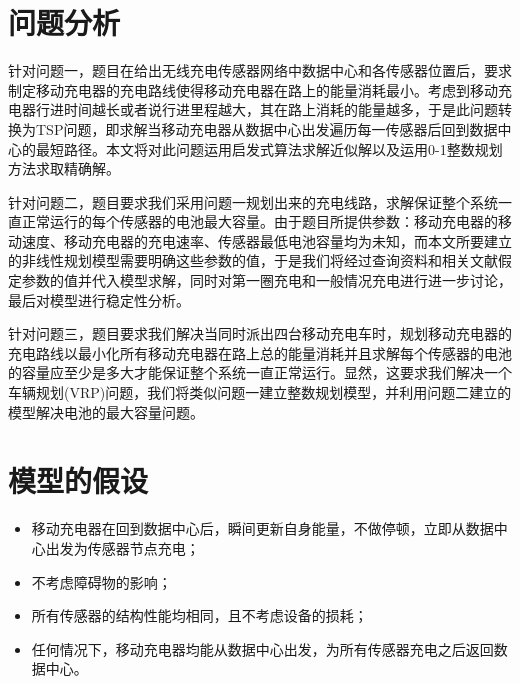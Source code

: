 \documentclass[withoutpreface,bwprint]{cumcmthesis} %
\begin{document}
\section{问题分析}
针对问题一，题目在给出无线充电传感器网络中数据中心和各传感器位置后，要求制定移动充电器的充电路线使得移动充电器在路上的能量消耗最小。考虑到移动充电器行进时间越长或者说行进里程越大，其在路上消耗的能量越多，于是此问题转换为TSP问题，即求解当移动充电器从数据中心出发遍历每一传感器后回到数据中心的最短路径。本文将对此问题运用启发式算法求解近似解以及运用0-1整数规划方法求取精确解。\par
针对问题二，题目要求我们采用问题一规划出来的充电线路，求解保证整个系统一直正常运行的每个传感器的电池最大容量。由于题目所提供参数：移动充电器的移动速度、移动充电器的充电速率、传感器最低电池容量均为未知，而本文所要建立的非线性规划模型需要明确这些参数的值，于是我们将经过查询资料和相关文献假定参数的值并代入模型求解，同时对第一圈充电和一般情况充电进行进一步讨论，最后对模型进行稳定性分析。\par
针对问题三，题目要求我们解决当同时派出四台移动充电车时，规划移动充电器的充电路线以最小化所有移动充电器在路上总的能量消耗并且求解每个传感器的电池的容量应至少是多大才能保证整个系统一直正常运行。显然，这要求我们解决一个车辆规划(VRP)问题，我们将类似问题一建立整数规划模型，并利用问题二建立的模型解决电池的最大容量问题。











	\section{模型的假设}
	\begin{itemize}
	\item 移动充电器在回到数据中心后，瞬间更新自身能量，不做停顿，立即从数据中心出发为传感器节点充电；
	\item 不考虑障碍物的影响；
	\item 所有传感器的结构性能均相同，且不考虑设备的损耗；
	\item 任何情况下，移动充电器均能从数据中心出发，为所有传感器充电之后返回数据中心。
	\end{itemize}\par	
	
	
	
	
	
\end{document}
